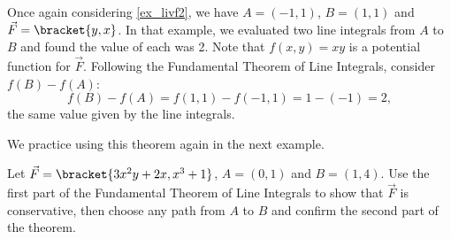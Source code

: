 Once again considering \autoref{ex_livf2}, we have $A = (-1,1)$, $B = (1,1)$ and $\vec F =\bracket{y,x}$. In that example, we evaluated two line integrals from $A$ to $B$ and found the value of each was 2. Note that $f(x,y) = xy$ is a potential function for $\vec F$. Following the Fundamental Theorem of Line Integrals, consider $f(B) - f(A)$:
\[f(B) - f(A) = f(1,1) - f(-1,1) = 1 - (-1) = 2,\]
the same value given by the line integrals.


We practice using this theorem again in the next example.

{Let $\vec F =\bracket{3x^2y+2x, x^3+1}$, $A = (0,1)$ and $B = (1,4)$. Use the first part of the Fundamental Theorem of Line Integrals to show that $\vec F$ is conservative, then choose any path from $A$ to $B$ and confirm the second part of the theorem.}
